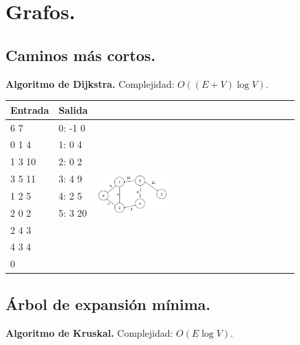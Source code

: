 \documentclass[11pt, letterpaper, twoside]{article}
\begin{document}
\section{Grafos.}

\subsection{Caminos más cortos.}

\textbf{Algoritmo de Dijkstra.} Complejidad: $O((E + V) \log V)$.



\begin{tabular}{|p{4cm}|p{4cm}|p{7.5cm}|}
\hline
\textbf{Entrada} & \textbf{Salida} & \\ \hline
6 7    & 0: -1 0 & \multirow{9}{*}{\includegraphics[width = 0.37\textwidth]{Grafos/Imagenes/ShortestPath.png}} \\
0 1 4  & 1: 0 4  & \\
1 3 10 & 2: 0 2  & \\
3 5 11 & 3: 4 9  & \\
1 2 5  & 4: 2 5  & \\
2 0 2  & 5: 3 20 & \\
2 4 3  & & \\
4 3 4  & & \\
0      & & \\ \hline
\end{tabular}

\subsection{Árbol de expansión mínima.}

\textbf{Algoritmo de Kruskal.} Complejidad: $O(E \log V)$.


\end{document}
